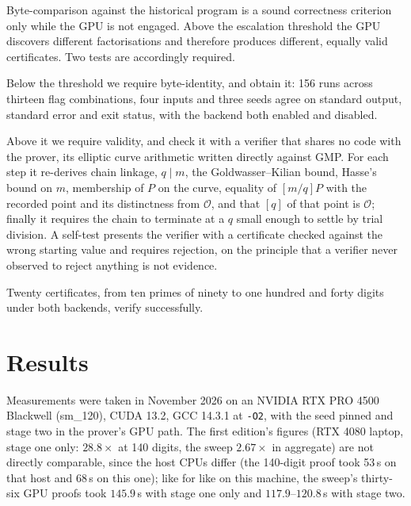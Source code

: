 \documentclass[11pt,a4paper]{article}
\newcommand{\code}[1]{\texttt{#1}}
\begin{document}
Byte-comparison against the historical program is a sound correctness
criterion only while the GPU is not engaged. Above the escalation
threshold the GPU discovers different factorisations and therefore
produces different, equally valid certificates. Two tests are accordingly
required.

Below the threshold we require byte-identity, and obtain it: 156 runs
across thirteen flag combinations, four inputs and three seeds agree on
standard output, standard error and exit status, with the backend both
enabled and disabled.

Above it we require validity, and check it with a verifier that shares no
code with the prover, its elliptic curve arithmetic written directly
against GMP. For each step it re-derives chain linkage, $q \mid m$, the
Goldwasser--Kilian bound, Hasse's bound on $m$, membership of $P$ on the
curve, equality of $[m/q]P$ with the recorded point and its distinctness
from $\mathcal{O}$, and that $[q]$ of that point is $\mathcal{O}$;
finally it requires the chain to terminate at a $q$ small enough to
settle by trial division. A self-test presents the verifier with a
certificate checked against the wrong starting value and requires
rejection, on the principle that a verifier never observed to reject
anything is not evidence.

Twenty certificates, from ten primes of ninety to one hundred and forty
digits under both backends, verify successfully.

\section{Results}
\label{sec:results}

Measurements were taken in November 2026 on an NVIDIA RTX PRO 4500 Blackwell
(sm\_120), CUDA 13.2, GCC 14.3.1 at \code{-O2}, with the seed pinned and stage two in
the prover's GPU path. The first edition's figures (RTX 4080 laptop, stage one only:
$28.8\times$ at 140 digits, the sweep $2.67\times$ in aggregate) are not directly
comparable, since the host CPUs differ (the 140-digit proof took 53\,s on that host and
68\,s on this one); like for like on this machine, the sweep's thirty-six GPU proofs took
$145.9$\,s with stage one only and $117.9$--$120.8$\,s with stage two.
\end{document}
